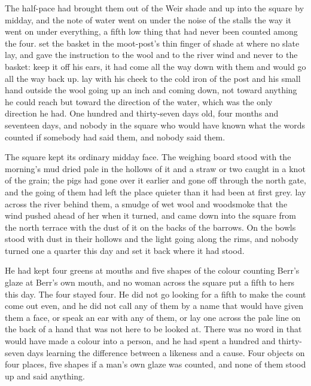 The half-pace had brought them out of the Weir shade and up into the square by midday, and the note of water went on under the noise of the stalls the way it went on under everything, a fifth low thing that had never been counted among the four.  set the basket in the moot-post's thin finger of shade at  where no slate lay, and gave the instruction to the wool and to the river wind and never to the basket: keep it off his ears, it had come all the way down with them and would go all the way back up.  lay with his cheek to the cold iron of the post and his small hand outside the wool going up an inch and coming down, not toward anything he could reach but toward the direction of the water, which was the only direction he had. One hundred and thirty-seven days old, four months and seventeen days, and nobody in the square who would have known what the words counted if somebody had said them, and nobody said them.

The square kept its ordinary midday face. The weighing board stood with the morning's mud dried pale in the hollows of it and a straw or two caught in a knot of the grain; the pigs had gone over it earlier and gone off through the north gate, and the going of them had left the place quieter than it had been at first grey.  lay across the river behind them, a smudge of wet wool and woodsmoke that the wind pushed ahead of her when it turned, and  came down into the square from the north terrace with the dust of it on the backs of the barrows. On  the bowls stood with dust in their hollows and the light going along the rims, and nobody turned one a quarter this day and set it back where it had stood.

He had kept four greens at mouths and five shapes of the colour counting Berr's glaze at Berr's own mouth, and no woman across the square put a fifth to hers this day. The four stayed four. He did not go looking for a fifth to make the count come out even, and he did not call any of them by a name that would have given them a face, or speak an ear with any of them, or lay one across the pale line on the back of a hand that was not here to be looked at. There was no word in  that would have made a colour into a person, and he had spent a hundred and thirty-seven days learning the difference between a likeness and a cause. Four objects on four places, five shapes if a man's own glaze was counted, and none of them stood up and said anything.

